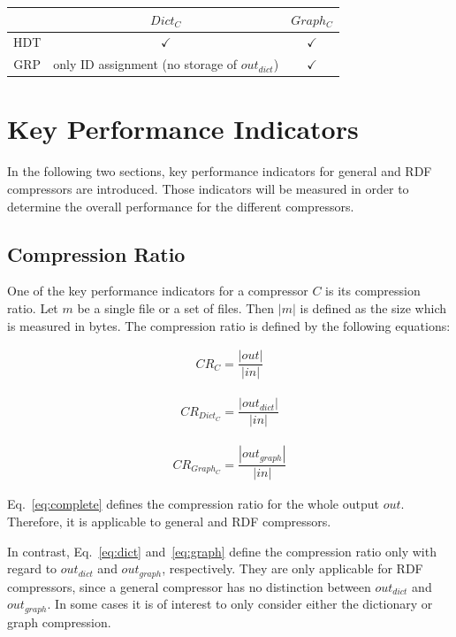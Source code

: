 \begin{center}
	\begin{tabular}{|c|c|c|}
		\hline 
		& $Dict_{C}$ & $Graph_{C}$ \\ 
		\hline \hline
		HDT & $\checkmark$ & $\checkmark$  \\ 
		\hline 
		GRP & only ID assignment (no storage of $out_{dict}$) & $\checkmark$ \\ 
		\hline 
	\end{tabular} 
	\label{tab:compressorsOverview}
\end{center}

\section{Key Performance Indicators}

In the following two sections, key performance indicators for general and RDF compressors are introduced. Those indicators will be measured in order to determine the overall performance for the different compressors.

\subsection{Compression Ratio}

One of the key performance indicators for a compressor $C$ is its compression ratio. Let $m$ be a single file or a set of files. Then $|m|$ is defined as the size which is measured in bytes. The compression ratio is defined by the following equations:

\begin{align}
CR_{C} = \dfrac{|out|}{ |in|} \label{eq:complete}
\end{align}

\begin{align}
CR_{Dict_C} = \dfrac{|out_{dict}|}{ |in|} \label{eq:dict}
\end{align}

\begin{align}
CR_{Graph_C} = \dfrac{|out_{graph}|}{ |in|} \label{eq:graph}
\end{align}

Eq.~\ref{eq:complete} defines the compression ratio for the whole output $out$. Therefore, it is applicable to general and RDF compressors.

In contrast, Eq.~\ref{eq:dict} and~\ref{eq:graph} define the compression ratio only with regard to $out_{dict}$ and $out_{graph}$, respectively. They are only applicable for RDF compressors, since a general compressor has no distinction between $out_{dict}$ and $out_{graph}$. In some cases it is of interest to only consider either the dictionary or graph compression.


